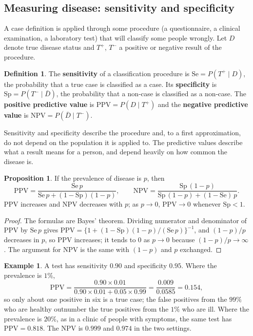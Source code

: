 \documentclass[11pt,a4paper]{article}
\numberwithin{equation}{section}
\theoremstyle{definition}
\newtheorem{defn}[thm]{Definition}
\newtheorem{exa}[thm]{Example}
\newtheorem{prop}[thm]{Proposition}
\begin{document}
\subsection{Measuring disease: sensitivity and specificity}
\label{sec:sensspec}

A case definition is applied through some procedure (a questionnaire, a clinical examination, a laboratory test) that will classify some
people wrongly. Let $D$ denote true disease status and $T^+$, $T^-$ a positive or negative result of the procedure.

\begin{defn}
The \textbf{sensitivity} of a classification procedure is $\text{Se} = P(T^+ \mid D)$, the probability that a true case is classified as a case. Its
\textbf{specificity} is $\text{Sp} = P(T^- \mid \bar D)$, the probability that a non-case is classified as a non-case. The \textbf{positive predictive value}
is $\text{PPV} = P(D \mid T^+)$ and the \textbf{negative predictive value} is $\text{NPV} = P(\bar D \mid T^-)$.
\end{defn}

Sensitivity and specificity describe the procedure and, to a first approximation, do not depend on the population it is applied to. The
predictive values describe what a result means for a person, and depend heavily on how common the disease is.

\begin{prop}
\label{prop:ppv}
If the prevalence of disease is $p$, then
\[
\text{PPV} = \frac{\text{Se}\,p}{\text{Se}\,p + (1 - \text{Sp})(1 - p)}, \qquad \text{NPV} = \frac{\text{Sp}\,(1 - p)}{\text{Sp}\,(1 - p) + (1 - \text{Se})\,p} .
\]
PPV increases and NPV decreases with $p$; as $p \to 0$, $\text{PPV} \to 0$ whenever $\text{Sp} < 1$.
\end{prop}

\begin{proof}
The formulas are Bayes' theorem. Dividing numerator and denominator of PPV by $\text{Se}\,p$ gives
$\text{PPV} = \{1 + (1 - \text{Sp})(1 - p)/(\text{Se}\,p)\}^{-1}$, and $(1 - p)/p$ decreases in $p$, so PPV increases; it tends to $0$ as $p \to 0$ because
$(1 - p)/p \to \infty$. The argument for NPV is the same with $(1 - p)$ and $p$ exchanged.
\end{proof}

\begin{exa}
A test has sensitivity $0.90$ and specificity $0.95$. Where the prevalence is $1\%$,
\[
\text{PPV} = \frac{0.90 \times 0.01}{0.90 \times 0.01 + 0.05 \times 0.99} = \frac{0.009}{0.0585} = 0.154 ,
\]
so only about one positive in six is a true case; the false positives from the $99\%$ who are healthy outnumber the true positives from the
$1\%$ who are ill. Where the prevalence is $20\%$, as in a clinic of people with symptoms, the same test has $\text{PPV} = 0.818$. The NPV
is $0.999$ and $0.974$ in the two settings.
\end{exa}
\end{document}

